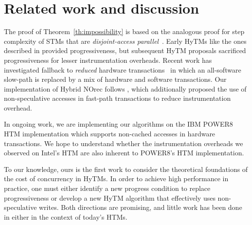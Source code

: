 \section{Related work and discussion}
\label{sec:rel}
%
The proof of Theorem~\ref{th:impossibility} is based on the analogous proof for step complexity of STMs that are \emph{disjoint-access parallel}~\cite{prog15-pact}.
Early HyTMs like the ones described in \cite{damronhytm, kumarhytm} provided progressiveness, but
subsequent HyTM proposals sacrificed progressiveness for lesser instrumentation overheads.
Recent work has investigated fallback to \emph{reduced} hardware transactions~\cite{MS13}
in which an all-software slow-path is replaced by a mix of hardware and software transactions. 
Our implementation of Hybrid NOrec follows \cite{hynorecriegel}, which additionally proposed the use of non-speculative accesses
in fast-path transactions to reduce instrumentation overhead. %

In ongoing work, we are implementing our algorithms on the IBM POWER8 HTM implementation which supports
non-cached accesses in hardware transactions.
We hope to understand whether the instrumentation overheads we observed
on Intel's HTM are also inherent to POWER8's HTM implementation.

To our knowledge, ours is the first work to consider the theoretical foundations of the cost of concurrency in HyTMs.
In order to achieve high performance in practice, one must either identify a new progress condition to replace progressiveness or develop a new HyTM algorithm that effectively uses non-speculative writes.
Both directions are promising, and little work has been done in either in the context of today's HTMs.